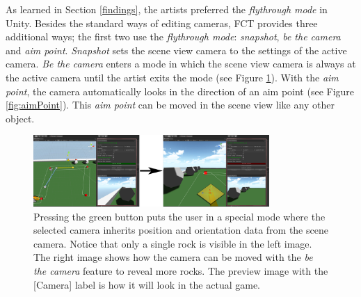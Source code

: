 As learned in Section \ref{findings}, the artists preferred the \textit{flythrough mode} in Unity. Besides the standard ways of editing cameras, FCT provides three additional ways; the first two use the \textit{flythrough mode}: \textit{snapshot}, \textit{be the camera} and \textit{aim point}. \textit{Snapshot} sets the scene view camera to the settings of the active camera. \textit{Be the camera} enters a mode in which the scene view camera is always at the active camera until the artist exits the mode (see Figure \ref{fig:beTheCam}). With the \textit{aim point}, the camera automatically looks in the direction of an aim point (see Figure \ref{fig:aimPoint}). This \textit{aim point} can be moved in the scene view like any other object.



\begin{figure}[htbp]
\centering
\includegraphics[width=0.8\textwidth]{Pics/beTheCam}
\caption{Pressing the green button puts the user in a special mode where the selected camera inherits position and orientation data from the scene camera. Notice that only a single rock is visible in the left image. The right image shows how the camera can be moved with the \textit{be the camera} feature to reveal more rocks. The preview image with the [Camera] label is how it will look in the actual game.}
\label{fig:beTheCam}
\end{figure}

